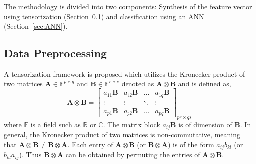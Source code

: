 

The methodology is divided into two components: Synthesis of the feature vector using tensorization (Section~\ref{sec:tensor}) and classification using an ANN (Section~\ref{sec:ANN}). 
\subsection{Data Preprocessing}
\label{sec:tensor}
A tensorization framework is proposed which utilizes the Kronecker product of two matrices $\mathbf{A} \in \mathbb{F}^{p\times q}$ and $\mathbf{B} \in \mathbb{F}^{r \times s}$ denoted as $\mathbf{A} \otimes \mathbf{B}$ and is defined as, 
%
\begin{equation} 
\mathbf{A} \otimes \mathbf{B} = \left[\begin{array}{rrrr}
a_{11} \mathbf{B}  & a_{12}\mathbf{B}  & \dots  & a_{1q} \mathbf{B}\\
\vdots  & \vdots   & \ddots   & \vdots\\
a_{p1} \mathbf{B} & a_{p2}\mathbf{B} & \dots & a_{pq} \mathbf{B}      
\end{array}\right]_{pr \times qs}
\end{equation}  
%
where $\mathbb{F}$ is a field such as $\mathbb{R}$ or $\mathbb{C}$. The matrix block  $a_{ij}\mathbf{B}$ is of dimension of $\mathbf{B}$.
In general, the Kronecker product of two matrices is non-commutative, meaning that $\mathbf{A}\otimes \mathbf{B} \ne \mathbf{B}\otimes \mathbf{A}$. Each entry of $\mathbf{A} \otimes \mathbf{B}$ (or $\mathbf{B}\otimes \mathbf{A}$) is of the form $a_{ij}b_{kl}$ (or $b_{kl}a_{ij}$). Thus $\mathbf{B}\otimes \mathbf{A}$ can be obtained by permuting the entries of $\mathbf{A}\otimes \mathbf{B}$.


